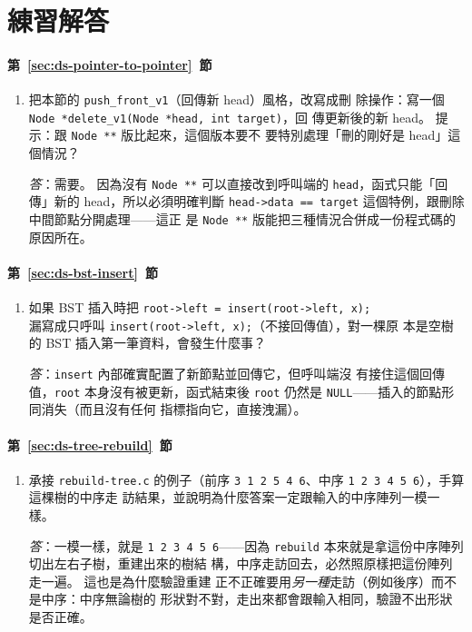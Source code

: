 {}
\section*{練習解答}

\paragraph{第~\ref{sec:ds-pointer-to-pointer}~節}
\begin{enumerate}
\item 把本節的 \texttt{push\_front\_v1}（回傳新 head）風格，改寫成刪
除操作：寫一個 \texttt{Node *delete\_v1(Node *head, int target)}，回
傳更新後的新 head。 提示：跟 \texttt{Node **} 版比起來，這個版本要不
要特別處理「刪的剛好是 head」這個情況？

\textit{答}：需要。 因為沒有 \texttt{Node **} 可以直接改到呼叫端的
\texttt{head}，函式只能「回傳」新的 head，所以必須明確判斷
\texttt{head->data == target} 這個特例，跟刪除中間節點分開處理——這正
是 \texttt{Node **} 版能把三種情況合併成一份程式碼的原因所在。
\end{enumerate}

\paragraph{第~\ref{sec:ds-bst-insert}~節}
\begin{enumerate}
\item 如果 BST 插入時把 \texttt{root->left = insert(root->left, x);}\\
漏寫成只呼叫 \texttt{insert(root->left, x);}（不接回傳值），對一棵原
本是空樹的 BST 插入第一筆資料，會發生什麼事？

\textit{答}：\texttt{insert} 內部確實配置了新節點並回傳它，但呼叫端沒
有接住這個回傳值，\texttt{root} 本身沒有被更新，函式結束後
\texttt{root} 仍然是 \texttt{NULL}——插入的節點形同消失（而且沒有任何
指標指向它，直接洩漏）。
\end{enumerate}

\paragraph{第~\ref{sec:ds-tree-rebuild}~節}
\begin{enumerate}
\item 承接 \texttt{rebuild-tree.c} 的例子（前序
\texttt{3 1 2 5 4 6}、中序 \texttt{1 2 3 4 5 6}），手算這棵樹的中序走
訪結果，並說明為什麼答案一定跟輸入的中序陣列一模一樣。

\textit{答}：一模一樣，就是 \texttt{1 2 3 4 5 6}——因為
\texttt{rebuild} 本來就是拿這份中序陣列切出左右子樹，重建出來的樹結
構，中序走訪回去，必然照原樣把這份陣列走一遍。 這也是為什麼驗證重建
正不正確要用\textit{另一種}走訪（例如後序）而不是中序：中序無論樹的
形狀對不對，走出來都會跟輸入相同，驗證不出形狀是否正確。
\end{enumerate}
